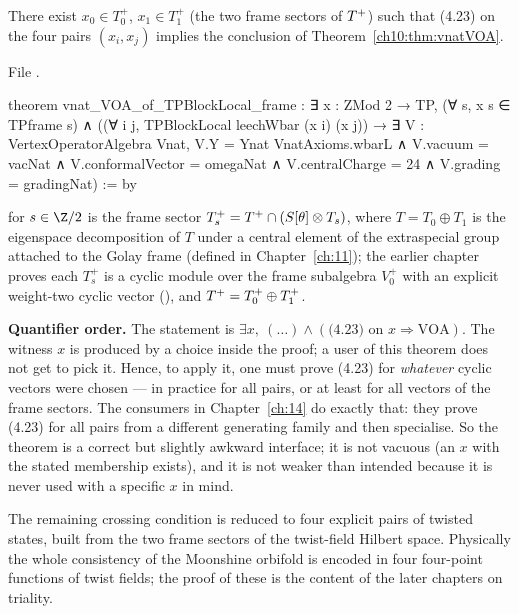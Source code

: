 \begin{theorem}\label{ch10:thm:frame}
There exist $x_0\in T^+_0$, $x_1\in T^+_1$ (the two frame sectors of $T^{+}$) such that (4.23)
on the four pairs $(x_i,x_j)$ implies the conclusion of Theorem~\ref{ch10:thm:vnatVOA}.
\end{theorem}
\noindent File .
\begin{leancode}
theorem vnat_VOA_of_TPBlockLocal_frame :
    ∃ x : ZMod 2 → TP, (∀ s, x s ∈ TPframe s) ∧
      ((∀ i j, TPBlockLocal leechWbar (x i) (x j)) →
        ∃ V : VertexOperatorAlgebra Vnat,
          V.Y = Ynat VnatAxioms.wbarL ∧ V.vacuum = vacNat ∧ V.conformalVector = omegaNat ∧
            V.centralCharge = 24 ∧ V.grading = gradingNat) := by
\end{leancode}
\begin{dictionary}
 for $s\in\Z/2$ is the frame sector $T^+_s=T^{+}\cap(S[\theta]\otimes T_s)$,
where $T=T_0\oplus T_1$ is the eigenspace decomposition of $T$ under a central element of the
extraspecial group attached to the Golay frame (defined in Chapter~\ref{ch:11}); the earlier
chapter proves each $T_s^+$ is a cyclic module over the frame subalgebra $V_0^+$ with an explicit
weight-two cyclic vector (), and $T^{+}=T_0^+\oplus T_1^+$.

\textbf{Quantifier order.}  The statement is $\exists x,\ (\dots)\wedge(\text{(4.23) on }x\Rightarrow
\text{VOA})$.  The witness $x$ is produced by a choice inside the proof; a user of this theorem
does not get to pick it.  Hence, to apply it, one must prove (4.23) for \emph{whatever} cyclic
vectors were chosen --- in practice for all pairs, or at least for all vectors of the frame
sectors.  The consumers in Chapter~\ref{ch:14} do exactly that: they prove (4.23) for all pairs
from a different generating family and then specialise.  So the theorem is a correct but
slightly awkward interface; it is not vacuous (an $x$ with the stated membership exists), and it
is not weaker than intended because it is never used with a specific $x$ in mind.
\end{dictionary}

\begin{physics}
The remaining crossing condition is reduced to four explicit pairs of twisted states, built from the two frame sectors of the twist-field Hilbert space. Physically the whole consistency of the Moonshine orbifold is encoded in four four-point functions of twist fields; the proof of these is the content of the later chapters on triality.
\end{physics}

